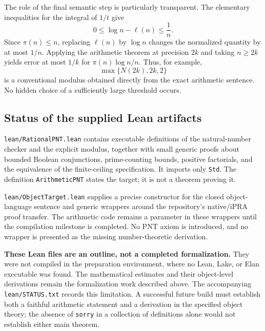 The role of the final semantic step is particularly transparent.  The
elementary inequalities for the integral of $1/t$ give
\[
 0\leq\log n-\ell(n)\leq\frac1n.
\]
Since $\pi(n)\leq n$, replacing $\ell(n)$ by $\log n$ changes the normalized
quantity by at most $1/n$.  Applying the arithmetic theorem at precision
$2k$ and taking $n\geq 2k$ yields error at most $1/k$ for
$\pi(n)\log n/n$.  Thus, for example,
\[
 \max\{N(2k),2k,2\}
\]
is a conventional modulus obtained directly from the exact arithmetic
sentence.  No hidden choice of a sufficiently large threshold occurs.

\subsection{Status of the supplied Lean artifacts}

\texttt{lean/RationalPNT.lean} contains executable definitions of the
natural-number checker and the explicit modulus, together with small
generic proofs about bounded Boolean conjunctions, prime-counting bounds,
positive factorials, and the equivalence of the finite-ceiling
specification.  It imports only \texttt{Std}.  The definition
\texttt{ArithmeticPNT} states the target; it is not a theorem proving it.

\texttt{lean/ObjectTarget.lean} supplies a precise constructor for the
closed object-language sentence and generic wrappers around the
repository's native/iPRA proof transfer.  The arithmetic code remains a
parameter in these wrappers until the compilation milestone is completed.
No PNT axiom is introduced, and no wrapper is presented as the missing
number-theoretic derivation.

\textbf{These Lean files are an outline, not a completed formalization.}
They were not compiled in the preparation environment, where no Lean,
Lake, or Elan executable was found.  The mathematical estimates and their
object-level derivations remain the formalization work described above.
The accompanying \texttt{lean/STATUS.txt} records this limitation.  A
successful future build must establish both a faithful arithmetic statement
and a derivation in the specified object theory; the absence of
\texttt{sorry} in a collection of definitions alone would not establish
either main theorem.
